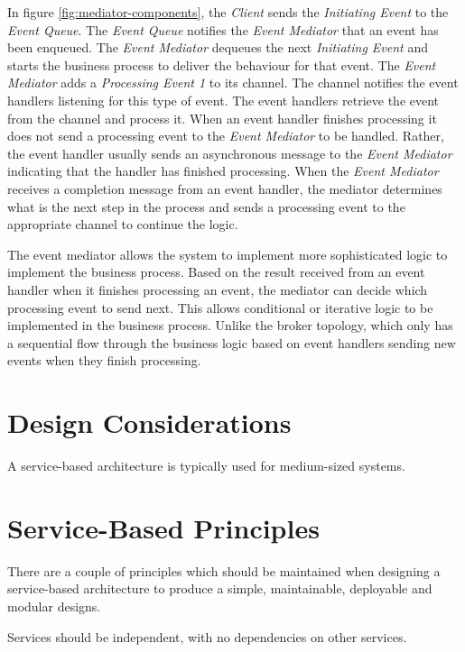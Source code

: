 In figure \ref{fig:mediator-components}, the \emph{Client} sends the \emph{Initiating Event} to the \emph{Event Queue}.
The \emph{Event Queue} notifies the \emph{Event Mediator} that an event has been enqueued.
The \emph{Event Mediator} dequeues the next \emph{Initiating Event} and starts the business process to deliver the behaviour for that event.
The \emph{Event Mediator} adds a \emph{Processing Event 1} to its channel.
The channel notifies the event handlers listening for this type of event.
The event handlers retrieve the event from the channel and process it.
When an event handler finishes processing it does not send a processing event to the \emph{Event Mediator} to be handled.
Rather, the event handler usually sends an asynchronous message to the \emph{Event Mediator} indicating that the handler has finished processing.
When the \emph{Event Mediator} receives a completion message from an event handler,
the mediator determines what is the next step in the process and sends a processing event to the appropriate channel to continue the logic.

The event mediator allows the system to implement more sophisticated logic to implement the business process.
Based on the result received from an event handler when it finishes processing an event,
the mediator can decide which processing event to send next.
This allows conditional or iterative logic to be implemented in the business process.
Unlike the broker topology, which only has a sequential flow through the business logic based on event handlers sending new events when they finish processing.


\section{Design Considerations}\label{sec:design-considerations}

A service-based architecture is typically used for medium-sized systems.


\section{Service-Based Principles}

There are a couple of principles which should be maintained when designing a service-based architecture
to produce a simple, maintainable, deployable and modular designs.

\vspace{1mm}
\begin{definition}\label{independent-service}
    Services should be independent, with no dependencies on other services.
\end{definition}



